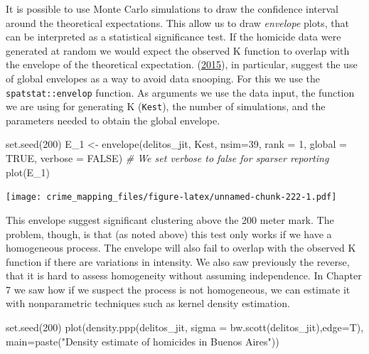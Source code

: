 \documentclass[
  krantz2]{krantz}
\makeatletter
\newenvironment{Shaded}{\begin{snugshade}}{\end{snugshade}}
\newcommand{\AttributeTok}[1]{\textcolor[rgb]{0.61,0.61,0.61}{#1}}
\newcommand{\CommentTok}[1]{\textcolor[rgb]{0.37,0.37,0.37}{\textit{#1}}}
\newcommand{\ConstantTok}[1]{\textcolor[rgb]{0,0,0}{#1}}
\newcommand{\DecValTok}[1]{\textcolor[rgb]{0.06,0.06,0.06}{#1}}
\newcommand{\FunctionTok}[1]{\textcolor[rgb]{0,0,0}{#1}}
\newcommand{\NormalTok}[1]{#1}
\newcommand{\OtherTok}[1]{\textcolor[rgb]{0.37,0.37,0.37}{#1}}
\newcommand{\StringTok}[1]{\textcolor[rgb]{0.5,0.5,0.5}{#1}}
\newenvironment{kframe}{%
\medskip{}
\setlength{\fboxsep}{.8em}
 \def\at@end@of@kframe{}%
 \ifinner\ifhmode%
  \def\at@end@of@kframe{\end{minipage}}%
  \begin{minipage}{\columnwidth}%
 \fi\fi%
 \def\FrameCommand##1{\hskip\@totalleftmargin \hskip-\fboxsep
 \colorbox{shadecolor}{##1}\hskip-\fboxsep
     \hskip-\linewidth \hskip-\@totalleftmargin \hskip\columnwidth}%
 \MakeFramed {\advance\hsize-\width
   \@totalleftmargin\z@ \linewidth\hsize
   \@setminipage}}%
 {\par\unskip\endMakeFramed%
 \at@end@of@kframe}
\renewenvironment{Shaded}{\begin{kframe}}{\end{kframe}}
\makeatother
\begin{document}
It is possible to use Monte Carlo simulations to draw the confidence interval around the theoretical expectations. This allow us to draw \emph{envelope} plots, that can be interpreted as a statistical significance test. If the homicide data were generated at random we would expect the observed K function to overlap with the envelope of the theoretical expectation. (\protect\hyperlink{ref-Baddeley_2016}{2015}), in particular, suggest the use of global envelopes as a way to avoid data snooping. For this we use the \texttt{spatstat::envelop} function. As arguments we use the data input, the function we are using for generating K (\texttt{Kest}), the number of simulations, and the parameters needed to obtain the global envelope.

\begin{Shaded}
\begin{Highlighting}[]
\FunctionTok{set.seed}\NormalTok{(}\DecValTok{200}\NormalTok{)}
\NormalTok{E\_1 }\OtherTok{\textless{}{-}} \FunctionTok{envelope}\NormalTok{(delitos\_jit, Kest, }\AttributeTok{nsim=}\DecValTok{39}\NormalTok{, }\AttributeTok{rank =} \DecValTok{1}\NormalTok{, }\AttributeTok{global =} \ConstantTok{TRUE}\NormalTok{,}
              \AttributeTok{verbose =} \ConstantTok{FALSE}\NormalTok{) }\CommentTok{\# We set verbose to false for sparser reporting}
\FunctionTok{plot}\NormalTok{(E\_1)}
\end{Highlighting}
\end{Shaded}

\texttt{[image: crime\_mapping\_files/figure-latex/unnamed-chunk-222-1.pdf]}

This envelope suggest significant clustering above the 200 meter mark. The problem, though, is that (as noted above) this test only works if we have a homogeneous process. The envelope will also fail to overlap with the observed K function if there are variations in intensity. We also saw previously the reverse, that it is hard to assess homogeneity without assuming independence. In Chapter 7 we saw how if we suspect the process is not homogeneous, we can estimate it with nonparametric techniques such as kernel density estimation.

\begin{Shaded}
\begin{Highlighting}[]
\FunctionTok{set.seed}\NormalTok{(}\DecValTok{200}\NormalTok{)}
\FunctionTok{plot}\NormalTok{(}\FunctionTok{density.ppp}\NormalTok{(delitos\_jit, }\AttributeTok{sigma =} \FunctionTok{bw.scott}\NormalTok{(delitos\_jit),}\AttributeTok{edge=}\NormalTok{T),}
     \AttributeTok{main=}\FunctionTok{paste}\NormalTok{(}\StringTok{"Density estimate of homicides in Buenos Aires"}\NormalTok{))}
\end{Highlighting}
\end{Shaded}
\end{document}
